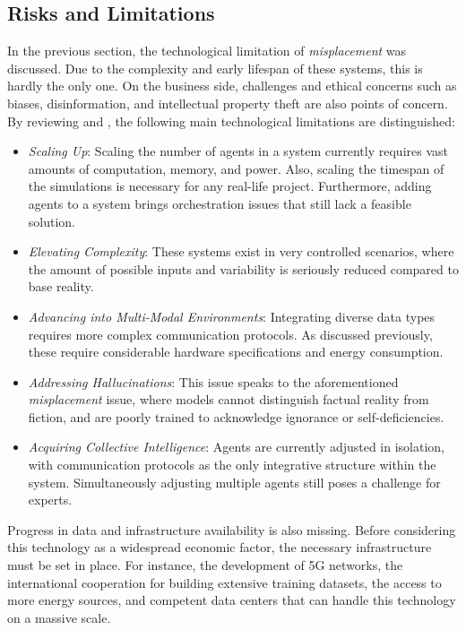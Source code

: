 \subsection{Risks and Limitations}
In the previous section, the technological limitation of \textit{misplacement} was discussed. Due to the complexity and early lifespan of these systems, this is hardly the only one. On the business side, challenges and ethical concerns such as biases, disinformation, and intellectual property theft are also points of concern. \\
By reviewing \textcite[p. 18]{li_metaagents_2023} and \textcite[pp. 10-11]{guo_large_2024}, the following main technological limitations are distinguished:
\begin{itemize}
    \item \textit{Scaling Up}: Scaling the number of agents in a system currently requires vast amounts of computation, memory, and power. Also, scaling the timespan of the simulations is necessary for any real-life project. Furthermore, adding agents to a system brings orchestration issues that still lack a feasible solution.
    \item \textit{Elevating Complexity}: These systems exist in very controlled scenarios, where the amount of possible inputs and variability is seriously reduced compared to base reality.
    \item \textit{Advancing into Multi-Modal Environments}: Integrating diverse data types requires more complex communication protocols. As discussed previously, these require considerable hardware specifications and energy consumption.
    \item \textit{Addressing Hallucinations}: This issue speaks to the aforementioned \textit{misplacement} issue, where models cannot distinguish factual reality from fiction, and are poorly trained to acknowledge ignorance or self-deficiencies. 
    \item \textit{Acquiring Collective Intelligence}: Agents are currently adjusted in isolation, with communication protocols as the only integrative structure within the system. Simultaneously adjusting multiple agents still poses a challenge for experts.
\end{itemize}
Progress in data and infrastructure availability is also missing. Before considering this technology as a widespread economic factor, the necessary infrastructure must be set in place. For instance, the development of 5G networks, the international cooperation for building extensive training datasets, the access to more energy sources, and competent data centers that can handle this technology on a massive scale. \\
